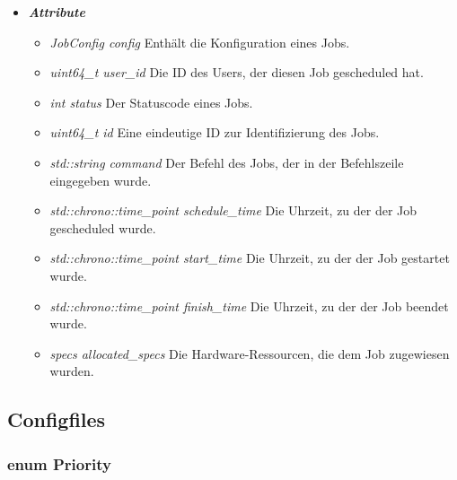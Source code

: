\documentclass[a4paper,12pt]{article}
\begin{document}
\begin{itemize}[label={}]

	\item \textit{\textbf{Attribute}}
		\begin{itemize}[label={\textbullet}]
			\item \textit{JobConfig config} Enthält die Konfiguration eines Jobs.
			
			\item \textit{uint64\_t user\_id} Die ID des Users, der diesen Job gescheduled hat.
			
			\item \textit{int status} Der Statuscode eines Jobs.
			
			\item \textit{uint64\_t id} Eine eindeutige ID zur Identifizierung des Jobs.
			
			\item \textit{std::string command} Der Befehl des Jobs, der in der Befehlszeile eingegeben wurde.
			
			\item \textit{std::chrono::time\_point schedule\_time} Die Uhrzeit, zu der der Job gescheduled wurde.
			
			\item \textit{std::chrono::time\_point start\_time} Die Uhrzeit, zu der der Job gestartet wurde.
			
			\item \textit{std::chrono::time\_point finish\_time} Die Uhrzeit, zu der der Job beendet wurde.
			
			\item \textit{specs allocated\_specs} Die Hardware-Ressourcen, die dem Job zugewiesen wurden.

		\end{itemize}


\end{itemize}
\clearpage

\subsection{Configfiles}

\subsubsection{enum Priority}
\end{document}
